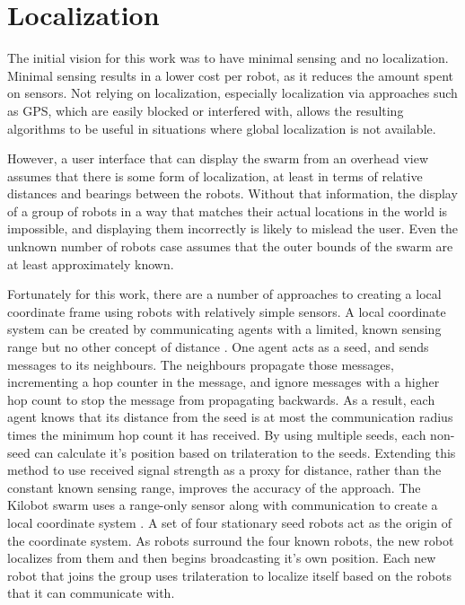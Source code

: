 \section{Localization}\label{sec:localization}

The initial vision for this work was to have minimal sensing and no localization. 
Minimal sensing results in a lower cost per robot, as it reduces the amount spent on sensors. 
Not relying on localization, especially localization via approaches such as GPS, which are easily blocked or interfered with, allows the resulting algorithms to be useful in situations where global localization is not available. 

However, a user interface that can display the swarm from an overhead view assumes that there is some form of localization, at least in terms of relative distances and bearings between the robots.
Without that information, the display of a group of robots in a way that matches their actual locations in the world is impossible, and displaying them incorrectly is likely to mislead the user. 
Even the unknown number of robots case assumes that the outer bounds of the swarm are at least approximately known. 

Fortunately for this work, there are a number of approaches to creating a local coordinate frame using robots with relatively simple sensors. 
A local coordinate system can be created by communicating agents with a limited, known sensing range but no other concept of distance \citep{bachrach2004experimental}.
One agent acts as a seed, and sends messages to its neighbours.
The neighbours propagate those messages, incrementing a hop counter in the message, and ignore messages with a higher hop count to stop the message from propagating backwards. 
As a result, each agent knows that its distance from the seed is at most the communication radius times the minimum hop count it has received. 
By using multiple seeds, each non-seed can calculate it's position based on trilateration to the seeds. 
Extending this method to use received signal strength as a proxy for distance, rather than the constant known sensing range, improves the accuracy of the approach.  
The Kilobot swarm uses a range-only sensor along with communication to create a local coordinate system \citep{Rubenstein795}.
A set of four stationary seed robots act as the origin of the coordinate system. As robots surround the four known robots, the new robot localizes from them and then begins broadcasting it's own position. 
Each new robot that joins the group uses trilateration to localize itself based on the robots that it can communicate with.

